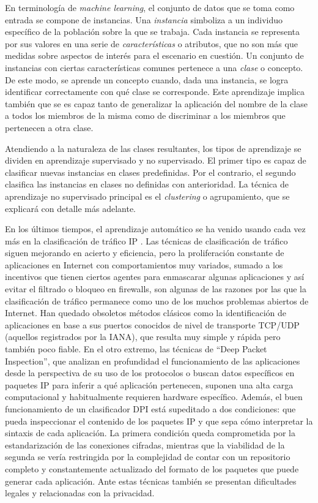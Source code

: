 En terminología de \emph{machine learning}, el conjunto de datos que se toma como entrada se compone de instancias.
Una \emph{instancia} simboliza a un individuo específico de la población sobre la que se trabaja.
Cada instancia se representa por sus valores en una serie de \emph{características} o atributos, que no son más que medidas sobre aspectos de interés para el escenario en cuestión.
Un conjunto de instancias con ciertas características comunes pertenece a una \emph{clase} o concepto.
De este modo, se aprende un concepto cuando, dada una instancia, se logra identificar correctamente con qué clase se corresponde.
Este aprendizaje implica también que se es capaz tanto de generalizar la aplicación del nombre de la clase a todos los miembros de la misma como de discriminar a los miembros que pertenecen a otra clase.

Atendiendo a la naturaleza de las clases resultantes, los tipos de aprendizaje se dividen en aprendizaje supervisado y no supervisado.
El primer tipo es capaz de clasificar nuevas instancias en clases predefinidas.
Por el contrario, el segundo clasifica las instancias en clases no definidas con anterioridad.
La técnica de aprendizaje no supervisado principal es el \emph{clustering} o agrupamiento, que se explicará con detalle más adelante.

En los últimos tiempos, el aprendizaje automático se ha venido usando cada vez más en la clasificación de tráfico IP \cite{Dainotti_2012}.
Las técnicas de clasificación de tráfico siguen mejorando en acierto y eficiencia, pero
la proliferación constante de aplicaciones en Internet con comportamientos muy variados, sumado a
los incentivos que tienen ciertos agentes para enmascarar algunas aplicaciones y así evitar el filtrado o bloqueo en firewalls,
son algunas de las razones por las que la clasificación de tráfico permanece como uno de los muchos problemas abiertos de Internet.
Han quedado obsoletos métodos clásicos como la identificación de aplicaciones en base a sus puertos conocidos de nivel de transporte TCP/UDP (aquellos registrados por la IANA),
que resulta muy simple y rápida pero también poco fiable.
En el otro extremo, las técnicas de ``Deep Packet Inspection''\cite{Finamore_2011}, que analizan en profundidad el funcionamiento de las aplicaciones desde la perspectiva de su uso de los protocolos o
buscan datos específicos en paquetes IP para inferir a qué aplicación pertenecen, suponen una alta carga computacional y habitualmente requieren hardware específico.
Además, el buen funcionamiento de un clasificador DPI está supeditado a dos condiciones: que pueda inspeccionar el contenido de los paquetes IP y que sepa cómo interpretar la sintaxis de cada aplicación.
La primera condición queda comprometida por la estandarización de las conexiones cifradas,
mientras que la viabilidad de la segunda se vería restringida por la complejidad de contar con un repositorio completo y constantemente actualizado del formato de los paquetes que puede generar cada aplicación.
Ante estas técnicas también se presentan dificultades legales y relacionadas con la privacidad.

